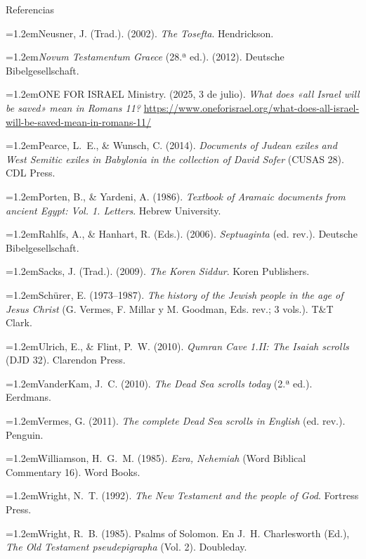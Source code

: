 \documentclass[hyperref={bookmarks=false},aspectratio=169]{beamer}
\newcommand{\refapa}[1]{\par\hangindent=1.2em\hangafter=1\noindent #1\par\vspace{3pt}}
\begin{document}
\begin{frame}[allowframebreaks]{Referencias}
\refapa{Neusner, J. (Trad.). (2002). \emph{The Tosefta}. Hendrickson.}
\refapa{\emph{Novum Testamentum Graece} (28.ª ed.). (2012). Deutsche Bibelgesellschaft.}
\refapa{ONE FOR ISRAEL Ministry. (2025, 3 de julio). \emph{What does «all Israel will be saved» mean in Romans 11?} \url{https://www.oneforisrael.org/what-does-all-israel-will-be-saved-mean-in-romans-11/}}
\refapa{Pearce, L.~E., \& Wunsch, C. (2014). \emph{Documents of Judean exiles and West Semitic exiles in Babylonia in the collection of David Sofer} (CUSAS 28). CDL Press.}
\refapa{Porten, B., \& Yardeni, A. (1986). \emph{Textbook of Aramaic documents from ancient Egypt: Vol. 1. Letters}. Hebrew University.}
\refapa{Rahlfs, A., \& Hanhart, R. (Eds.). (2006). \emph{Septuaginta} (ed. rev.). Deutsche Bibelgesellschaft.}
\refapa{Sacks, J. (Trad.). (2009). \emph{The Koren Siddur}. Koren Publishers.}
\refapa{Schürer, E. (1973--1987). \emph{The history of the Jewish people in the age of Jesus Christ} (G. Vermes, F. Millar y M. Goodman, Eds. rev.; 3 vols.). T\&T Clark.}
\refapa{Ulrich, E., \& Flint, P.~W. (2010). \emph{Qumran Cave 1.II: The Isaiah scrolls} (DJD 32). Clarendon Press.}
\refapa{VanderKam, J.~C. (2010). \emph{The Dead Sea scrolls today} (2.ª ed.). Eerdmans.}
\refapa{Vermes, G. (2011). \emph{The complete Dead Sea scrolls in English} (ed. rev.). Penguin.}
\refapa{Williamson, H.~G.~M. (1985). \emph{Ezra, Nehemiah} (Word Biblical Commentary 16). Word Books.}
\refapa{Wright, N.~T. (1992). \emph{The New Testament and the people of God}. Fortress Press.}
\refapa{Wright, R.~B. (1985). Psalms of Solomon. En J.~H. Charlesworth (Ed.), \emph{The Old Testament pseudepigrapha} (Vol. 2). Doubleday.}
\end{frame}
\end{document}
